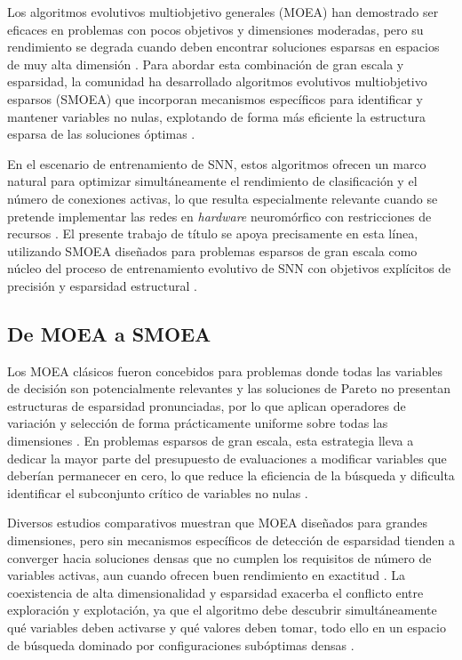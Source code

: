 Los algoritmos evolutivos multiobjetivo generales (MOEA) han demostrado ser eficaces en problemas con pocos objetivos y dimensiones moderadas, pero su rendimiento se degrada cuando deben encontrar soluciones esparsas en espacios de muy alta dimensión \cite{Hua2021MOEA, Shao2025_SMOEA}. Para abordar esta combinación de gran escala y esparsidad, la comunidad ha desarrollado algoritmos evolutivos multiobjetivo esparsos (SMOEA) que incorporan mecanismos específicos para identificar y mantener variables no nulas, explotando de forma más eficiente la estructura esparsa de las soluciones óptimas \cite{Tian2020AnEALSMOP, HUANG2025-enhanced-moea-lsmo}.

En el escenario de entrenamiento de SNN, estos algoritmos ofrecen un marco natural para optimizar simultáneamente el rendimiento de clasificación y el número de conexiones activas, lo que resulta especialmente relevante cuando se pretende implementar las redes en \textit{hardware} neuromórfico con restricciones de recursos \cite{REINERS2022sparse, dimovska2020multiobjectiveoptimizationsizeresilience}. El presente trabajo de título se apoya precisamente en esta línea, utilizando SMOEA diseñados para problemas esparsos de gran escala como núcleo del proceso de entrenamiento evolutivo de SNN con objetivos explícitos de precisión y esparsidad estructural \cite{Shao2025_SMOEA}.


\subsection{De MOEA a SMOEA}
Los MOEA clásicos fueron concebidos para problemas donde todas las variables de decisión son potencialmente relevantes y las soluciones de Pareto no presentan estructuras de esparsidad pronunciadas, por lo que aplican operadores de variación y selección de forma prácticamente uniforme sobre todas las dimensiones \cite{TIAN2024-lsmoea, Hua2021MOEA}. En problemas esparsos de gran escala, esta estrategia lleva a dedicar la mayor parte del presupuesto de evaluaciones a modificar variables que deberían permanecer en cero, lo que reduce la eficiencia de la búsqueda y dificulta identificar el subconjunto crítico de variables no nulas \cite{Shao2025_SMOEA}.

Diversos estudios comparativos muestran que MOEA diseñados para grandes dimensiones, pero sin mecanismos específicos de detección de esparsidad tienden a converger hacia soluciones densas que no cumplen los requisitos de número de variables activas, aun cuando ofrecen buen rendimiento en exactitud \cite{ZOU2025-sparse-LSMOEA, Wang2025-ea-genetic-large-scale}. La coexistencia de alta dimensionalidad y esparsidad exacerba el conflicto entre exploración y explotación, ya que el algoritmo debe descubrir simultáneamente qué variables deben activarse y qué valores deben tomar, todo ello en un espacio de búsqueda dominado por configuraciones subóptimas densas \cite{Tian2020AnEALSMOP, Shao2026AnEA-LSMOP}.


